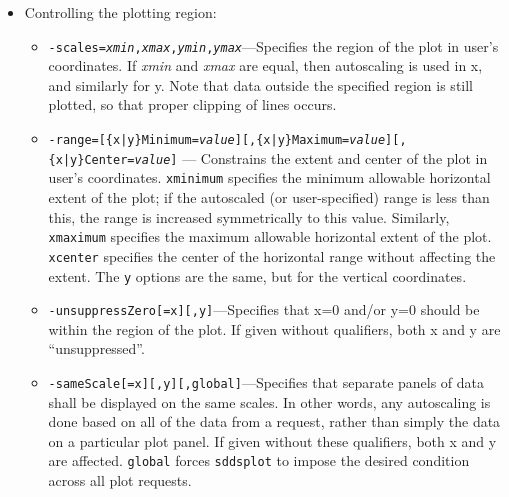 \begin{itemize}
\begin{itemize}
\begin{itemize}
{\tt centered} specifies that arrows should be centered on the corresponding (x, y) point; by
default, the arrow starts at the (x, y) point.  {\tt singleBarb} specifies that arrows should have
only a single barb, rather than the default two barbs; this can be significantly faster for large
amounts of data.  {\tt barbLength} and {\tt barbAngle} specify the length and angle of arrow barbs;
the barb length is a specified as a fraction of the arrow length, which the barb angle is specified
in degrees.

  \item {\tt -linetypeDefault={\em integer}}--- Specifies the default line type for borders, legend
        text, labels, axes, and so on.  If not given, 0 is used.

\end{itemize}

\item Controlling the plotting region:
  \begin{itemize} 

   \item {\tt -scales={\em xmin},{\em xmax},{\em ymin},{\em ymax}}---Specifies the region of the plot in user's
coordinates.  If {\em xmin} and {\em xmax} are equal, then autoscaling is used in x, and similarly for y. Note
that data outside the specified region is still plotted, so that proper clipping of lines occurs.
 
 \item {\tt -range=[\{x|y\}Minimum={\em value}][,\{x|y\}Maximum={\em value}][,\{x|y\}Center={\em value}]}
        --- Constrains the extent
        and center of the plot in user's coordinates.  {\tt xminimum} specifies the minimum allowable
        horizontal extent of the plot; if the autoscaled (or user-specified) range is less than this, the
        range is increased symmetrically to this value.  Similarly, {\tt xmaximum} specifies the maximum
        allowable horizontal extent of the plot.  {\tt xcenter} specifies the center of the horizontal
        range without affecting the extent.  The {\tt y} options are the same, but for the vertical
        coordinates.
  \item {\tt -unsuppressZero[=x][,y]}---Specifies that x=0 and/or y=0 should be within the region of
the plot.  If given without qualifiers, both x and y are ``unsuppressed''.

  \item {\tt -sameScale[=x][,y][,global]}---Specifies that separate panels of data shall be displayed
on the same scales.  In other words, any autoscaling is done based on all of the data from a request,
rather than simply the data on a particular plot panel.  If given without these qualifiers, both x
and y are affected.  {\tt global} forces {\tt sddsplot} to impose the desired condition across all
plot requests.


\end{itemize}
\end{itemize}
\end{itemize}
